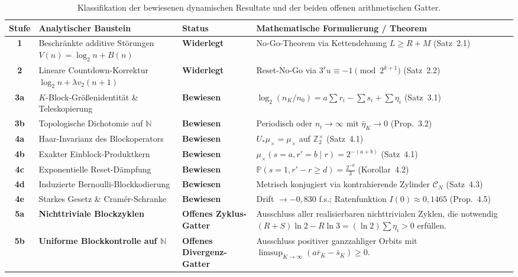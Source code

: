 \documentclass[11pt,reqno]{amsart}
\theoremstyle{definition}
\theoremstyle{remark}
\numberwithin{equation}{section}
\begin{document}
\begin{table}[h!]
\centering
\small
\renewcommand{\arraystretch}{1.3}
\begin{tabular}{clll}
\toprule
\textbf{Stufe} & \textbf{Analytischer Baustein} & \textbf{Status} & \textbf{Mathematische Formulierung / Theorem} \\
\midrule
\textbf{1} & Beschr\"ankte additive St\"orungen $V(n) = \log_2 n + B(n)$ & \textbf{Widerlegt} & No-Go-Theorem via Kettendehnung $L \ge R+M$ (Satz~2.1) \\
\textbf{2} & Lineare Countdown-Korrektur $\log_2 n + \lambda v_2(n+1)$ & \textbf{Widerlegt} & Reset-No-Go via $3^r u \equiv -1 \pmod{2^{k+1}}$ (Satz~2.2) \\
\midrule
\textbf{3a} & $K$-Block-Gr\"o\ss{}enidentit\"at \& Teleskopierung & \textbf{Bewiesen} & $\log_2(n_K/n_0) = a \sum r_i - \sum s_i + \sum \eta_i$ (Satz~3.1) \\
\textbf{3b} & Topologische Dichotomie auf $\mathbb{N}$ & \textbf{Bewiesen} & Periodisch oder $n_i \to \infty$ mit $\bar{\eta}_K \to 0$ (Prop.~3.2) \\
\midrule
\textbf{4a} & Haar-Invarianz des Blockoperators & \textbf{Bewiesen} & $U_* \mu_\times = \mu_\times$ auf $\mathbb{Z}_2^\times$ (Satz~4.1) \\
\textbf{4b} & Exakter Einblock-Produktkern & \textbf{Bewiesen} & $\mu_\times(s=a, r'=b \mid r) = 2^{-(a+b)}$ (Satz~4.1) \\
\textbf{4c} & Exponentielle Reset-D\"ampfung & \textbf{Bewiesen} & $\mathbb{P}(s=1, r'-r \ge d) = \frac{2^{-d}}{3}$ (Korollar~4.2) \\
\textbf{4d} & Induzierte Bernoulli-Blockkodierung & \textbf{Bewiesen} & Metrisch konjugiert via kontrahierende Zylinder $\mathcal{C}_N$ (Satz~4.3) \\
\textbf{4e} & Starkes Gesetz \& Cram\'er-Schranke & \textbf{Bewiesen} & Drift $\to -0{,}830$ f.s.; Ratenfunktion $I(0) \approx 0{,}1465$ (Prop.~4.5) \\
\midrule
\textbf{5a} & \textbf{Nichttriviale Blockzyklen} & \textbf{Offenes Zyklus-Gatter} & 
\parbox[t]{6.8cm}{Ausschluss aller realisierbaren nichttrivialen Zyklen, die notwendig $(R+S)\ln 2 - R\ln 3 = (\ln 2)\sum \eta_i > 0$ erf\"ullen.} \\
\textbf{5b} & \textbf{Uniforme Blockkontrolle auf $\mathbb{N}$} & \textbf{Offenes Divergenz-Gatter} & 
\parbox[t]{6.8cm}{Ausschluss positiver ganzzahliger Orbits mit $\limsup_{K \to \infty} (a \bar{r}_K - \bar{s}_K) \ge 0$.} \\
\bottomrule
\end{tabular}
\caption{Klassifikation der bewiesenen dynamischen Resultate und der beiden offenen arithmetischen Gatter.}
\label{tab:final_research_ladder}
\end{table}
\end{document}
